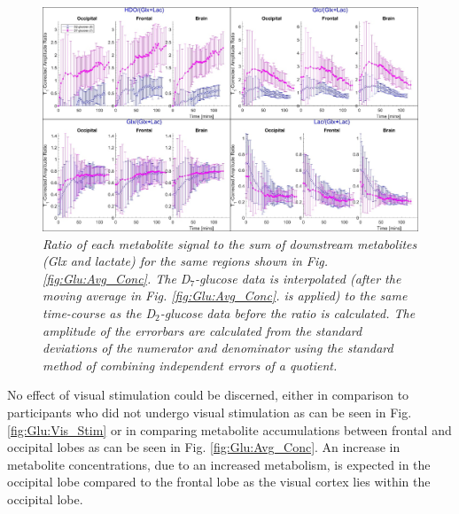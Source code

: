 \begin{figure}
    \centering
    \includegraphics[width = 1\textwidth]{Figures/Glucose/HDO_Ratio.png}
    \caption{\textit{Ratio of each metabolite signal to the sum of downstream metabolites (Glx and lactate) for the same regions shown in Fig. \ref{fig:Glu:Avg_Conc}. The D$_7$-glucose data is interpolated (after the moving average in Fig. \ref{fig:Glu:Avg_Conc}. is applied) to the same time-course as the D$_2$-glucose data before the ratio is calculated. The amplitude of the errorbars are calculated from the standard deviations of the numerator and denominator using the standard method of combining independent errors of a quotient.}}
    \label{fig:Glu:HDO_Rat}
\end{figure}

No effect of visual stimulation could be discerned, either in comparison to participants who did not undergo visual stimulation as can be seen in Fig. \ref{fig:Glu:Vis_Stim} or in comparing metabolite accumulations between frontal and occipital lobes as can be seen in Fig. \ref{fig:Glu:Avg_Conc}. An increase in metabolite concentrations, due to an increased metabolism, is expected in the occipital lobe compared to the frontal lobe as the visual cortex lies within the occipital lobe.

